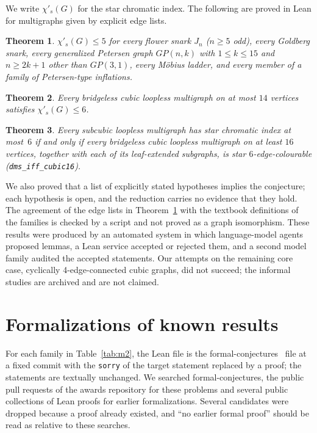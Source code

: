 \documentclass[11pt,a4paper]{article}
\newcommand{\lean}[1]{\texttt{#1}}
\newtheorem{theorem}{Theorem}[section]
\theoremstyle{remark}
\begin{document}
We write $\chi'_s(G)$ for the star chromatic index. The following are proved in Lean for multigraphs given by
explicit edge lists.

\begin{theorem}\label{thm:families}
$\chi'_s(G)\le5$ for every flower snark $J_n$ ($n\ge5$ odd), every Goldberg snark, every generalized Petersen graph
$GP(n,k)$ with $1\le k\le15$ and $n\ge2k+1$ other than $GP(3,1)$, every M\"obius ladder, and every member of a family
of Petersen-type inflations.
\end{theorem}

\begin{theorem}\label{thm:le14}
Every bridgeless cubic loopless multigraph on at most $14$ vertices satisfies $\chi'_s(G)\le6$.
\end{theorem}

\begin{theorem}\label{thm:equiv}
Every subcubic loopless multigraph has star chromatic index at most~$6$ if and only if every bridgeless cubic loopless multigraph on at
least $16$ vertices, together with each of its leaf-extended subgraphs, is star $6$-edge-colourable
(\lean{dms\_iff\_cubic16}).
\end{theorem}

\noindent We also proved that a list of explicitly stated hypotheses implies the conjecture; each hypothesis is open,
and the reduction carries no evidence that they hold. The agreement of the edge lists in Theorem~\ref{thm:families}
with the textbook definitions of the families is checked by a script and not proved as a graph isomorphism. These
results were produced by an automated system in which language-model agents proposed lemmas, a Lean service accepted
or rejected them, and a second model family audited the accepted statements. Our attempts on the remaining core case,
cyclically 4-edge-connected cubic graphs, did not succeed; the informal studies are archived and are not claimed.

\section{Formalizations of known results}\label{sec:m2}

For each family in Table~\ref{tab:m2}, the Lean file is the formal-conjectures~\cite{fc} file at a fixed commit with
the \lean{sorry} of the target statement replaced by a proof; the statements are textually unchanged. We searched
formal-conjectures, the public pull requests of the awards repository for these problems and several public
collections of Lean proofs for earlier formalizations. Several candidates were dropped because a proof already
existed, and ``no earlier formal proof'' should be read as relative to these searches.
\end{document}

